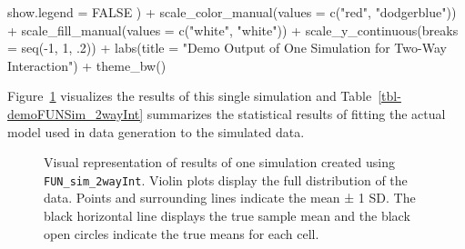\documentclass[
  letterpaper,
  DIV=11,
  numbers=noendperiod]{scrartcl}
\newenvironment{Shaded}{\begin{snugshade}}{\end{snugshade}}
\newcommand{\AttributeTok}[1]{\textcolor[rgb]{0.40,0.45,0.13}{#1}}
\newcommand{\ConstantTok}[1]{\textcolor[rgb]{0.56,0.35,0.01}{#1}}
\newcommand{\DecValTok}[1]{\textcolor[rgb]{0.68,0.00,0.00}{#1}}
\newcommand{\FunctionTok}[1]{\textcolor[rgb]{0.28,0.35,0.67}{#1}}
\newcommand{\NormalTok}[1]{\textcolor[rgb]{0.00,0.23,0.31}{#1}}
\newcommand{\SpecialCharTok}[1]{\textcolor[rgb]{0.37,0.37,0.37}{#1}}
\newcommand{\StringTok}[1]{\textcolor[rgb]{0.13,0.47,0.30}{#1}}
\begin{document}
\begin{Shaded}
\begin{Highlighting}[]
    \AttributeTok{show.legend =} \ConstantTok{FALSE}
\NormalTok{  ) }\SpecialCharTok{+}
  \FunctionTok{scale\_color\_manual}\NormalTok{(}\AttributeTok{values =} \FunctionTok{c}\NormalTok{(}\StringTok{"red"}\NormalTok{, }\StringTok{"dodgerblue"}\NormalTok{)) }\SpecialCharTok{+}
  \FunctionTok{scale\_fill\_manual}\NormalTok{(}\AttributeTok{values =} \FunctionTok{c}\NormalTok{(}\StringTok{"white"}\NormalTok{, }\StringTok{"white"}\NormalTok{)) }\SpecialCharTok{+}
  \FunctionTok{scale\_y\_continuous}\NormalTok{(}\AttributeTok{breaks =} \FunctionTok{seq}\NormalTok{(}\SpecialCharTok{{-}}\DecValTok{1}\NormalTok{, }\DecValTok{1}\NormalTok{, .}\DecValTok{2}\NormalTok{)) }\SpecialCharTok{+}
  \FunctionTok{labs}\NormalTok{(}\AttributeTok{title =} \StringTok{"Demo Output of One Simulation for Two{-}Way Interaction"}\NormalTok{) }\SpecialCharTok{+}
  \FunctionTok{theme\_bw}\NormalTok{()}
\end{Highlighting}
\end{Shaded}

Figure~\ref{fig-demoFUNSim_2wayInt} visualizes the results of this
single simulation and Table~\ref{tbl-demoFUNSim_2wayInt} summarizes the
statistical results of fitting the actual model used in data generation
to the simulated data.

\begin{figure}


\caption{\label{fig-demoFUNSim_2wayInt}Visual representation of results
of one simulation created using \texttt{FUN\_sim\_2wayInt}. Violin plots
display the full distribution of the data. Points and surrounding lines
indicate the mean ± 1 SD. The black horizontal line displays the true
sample mean and the black open circles indicate the true means for each
cell.}

\end{figure}%
\end{document}
